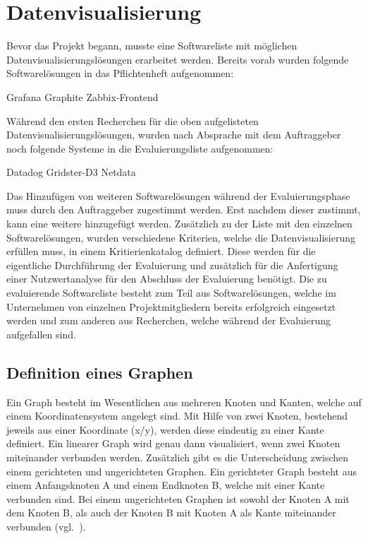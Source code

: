 \section{Datenvisualisierung}
\label{sec:datenvisualisierung}
Bevor das Projekt begann, musste eine Softwareliste mit möglichen
Datenvisualisierungslösungen erarbeitet werden. Bereits vorab wurden folgende
Softwarelösungen in das Pflichtenheft aufgenommen:

\begin{outline}
  \1 Grafana
  \1 Graphite
  \1 Zabbix\hyp{}Frontend
\end{outline}

Während den ersten Recherchen für die oben aufgelisteten
Datenvisualisierungslösungen, wurden nach Absprache mit dem Auftraggeber noch
folgende Systeme in die Evaluierungsliste aufgenommen:

\begin{outline}
  \1 Datadog
  \1 Gridster\hyp{}D3
  \1 Netdata
\end{outline}

Das Hinzufügen von weiteren Softwarelösungen während der Evaluierungsphase
muss durch den Auftraggeber zugestimmt werden. Erst nachdem dieser zustimmt,
kann eine weitere hinzugefügt werden. Zusätzlich zu der Liste mit den
einzelnen Softwarelösungen, wurden verschiedene Kriterien, welche die
Datenvisualisierung erfüllen muss, in einem Kritierienkatalog definiert. Diese
werden für die eigentliche Durchführung der Evaluierung und
zusätzlich für die Anfertigung einer Nutzwertanalyse für den Abschluss der
Evaluierung benötigt. Die zu evaluierende Softwareliste besteht zum Teil aus
Softwarelösungen, welche im Unternehmen von einzelnen Projektmitgliedern
bereits erfolgreich eingesetzt werden und zum anderen aus Recherchen, welche
während der Evaluierung aufgefallen sind.
\mr%

\subsection{Definition eines Graphen}
\label{subsec:definition_eines_graphen}
Ein Graph besteht im Wesentlichen aus mehreren Knoten und Kanten, welche auf
einem Koordinatensystem angelegt sind. Mit Hilfe von zwei Knoten, bestehend
jeweils aus einer Koordinate (x/y), werden diese eindeutig zu einer Kante
definiert. Ein linearer Graph wird genau dann visualisiert, wenn zwei Knoten
miteinander verbunden werden. Zusätzlich gibt es die Unterscheidung zwischen
einem gerichteten und ungerichteten Graphen. Ein gerichteter Graph besteht aus
einem Anfangsknoten A und einem Endknoten B, welche mit einer Kante verbunden
sind. Bei einem ungerichteten Graphen ist sowohl der Knoten A mit dem Knoten B,
als auch der Knoten B mit Knoten A als Kante miteinander
verbunden (vgl.~\cite{kaiser2008c}).


